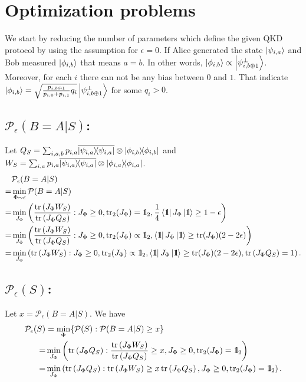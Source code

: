 \documentclass[12pt,a4paper,reqno, aps, superscriptaddress]{amsart}
\newcommand{\Id}{{\rm 1\hspace{-0.9mm}l}}
\newcommand{\PP}{\ensuremath{\mathcal{P}}}
\newcommand{\proj}[1]{\ensuremath{\ketbra{#1}{#1}}}
\begin{document}
\section{Optimization problems}
We start by reducing the number of parameters 
which define the given QKD protocol by using the assumption for 
$\epsilon=0$. If Alice 
generated the state $\ket{\psi_{i,a}}$ and Bob measured $\ket{\phi_{i,b}}$ that 
means $a=b$. 
In other words, $\ket{\phi_{i,b}} \propto \ket{\psi_{i,b\oplus 1}^\perp}$. 
Moreover, for each $i$ 
there can not be any bias between $0$ and $1$. That indicate $\ket{\phi_{i,b}} 
= \sqrt{\frac{ p_{i,b \oplus 1}}{p_{i,0}+p_{i,1}}q_i}\ket{\psi_{i,b\oplus 
1}^\perp}$ for some $q_i > 0$.

\subsection{$\PP_\epsilon(B=A|S)$:}
Let $Q_S = \sum_{i,a,b}  
p_{i,a} \overline{\proj{\psi_{i,a}}} 
\otimes \proj{\phi_{i,b}}$ and $W_S = \sum_{i,a}  
p_{i,a} \overline{\proj{\psi_{i,a}}} 
\otimes \proj{\phi_{i,a}}$.
\begin{equation}
\begin{split}
&\PP_\epsilon(B=A|S)\\ =& \min_{\Phi \sim \epsilon} \PP(B=A|S)\\
=&\min_{J_\Phi} \left( \frac{\tr\left(J_\Phi W_S\right)}{\tr\left(J_\Phi 
Q_S\right)}: J_\Phi \ge 0, \tr_2(J_\Phi) 
= \Id_2,
\frac14 \bra{\Id} J_\Phi \ket{\Id} \ge 1-\epsilon \right)\\
=&\min_{J_\Phi} \left( \frac{\tr\left(J_\Phi W_S\right)}{\tr\left(J_\Phi 
Q_S\right)}: J_\Phi \ge 0, \tr_2(J_\Phi) 
\propto \Id_2,
\bra{\Id} J_\Phi \ket{\Id} \ge \tr(J_\Phi)(2-2\epsilon) \right)\\
=&\min_{J_\Phi} \left( \tr\left(J_\Phi W_S\right): J_\Phi \ge 0, 
\tr_2(J_\Phi) 
\propto \Id_2,
\bra{\Id} J_\Phi \ket{\Id} \ge \tr(J_\Phi)(2-2\epsilon), \tr\left(J_\Phi 
Q_S\right)=1 \right).
\end{split}
\end{equation}

\subsection{$\PP_\epsilon(S)$:}
Let $x = \PP_\epsilon(B=A|S)$. We have
\begin{equation}
\begin{split}
\PP_\epsilon(S) &= \min_{\Phi}\{ \PP(S): \PP(B=A|S) \ge 
x \}\\
=&\min_{J_\Phi} \left(\tr\left(J_\Phi 
Q_S\right):  \frac{\tr\left(J_\Phi W_S\right)}{\tr\left(J_\Phi 
Q_S\right)} \ge x, J_\Phi \ge 0, \tr_2(J_\Phi) 
= \Id_2 \right)\\
=&\min_{J_\Phi} \left(\tr\left(J_\Phi 
Q_S\right):  \tr\left(J_\Phi W_S\right)\ge x\tr\left(J_\Phi 
Q_S\right), J_\Phi \ge 0, \tr_2(J_\Phi) 
= \Id_2 \right).
\end{split}
\end{equation}
\end{document}
